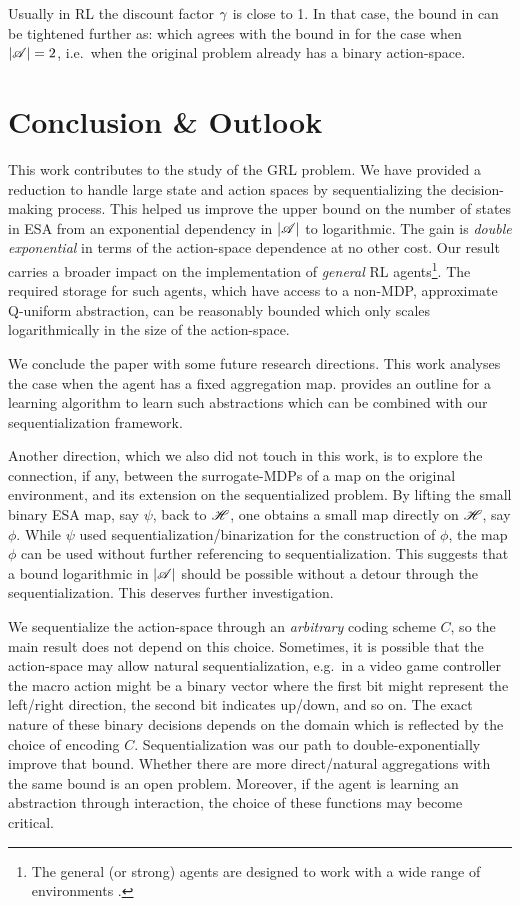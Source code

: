 \documentclass{article} %
\begin{document}
Usually in RL the discount factor $\gamma$ is close to 1. In that case, the bound in  can be tightened further as:
\beq
\abs{\S} \lesssim {}
\eeq
which agrees with the bound in  for the case when ${\left\lvert\mathscr{A}\right\rvert} = 2$, i.e.\ when the original problem already has a binary action-space.

\section{Conclusion \& Outlook}\label{sec:conclusion}
\vspace{-1.87mm}

This work contributes to the study of the GRL problem. We have provided a reduction to handle large state and action spaces by sequentializing the decision-making process.
This helped us improve the upper bound on the number of states in ESA from an exponential dependency in ${\left\lvert\mathscr{A}\right\rvert}$ to logarithmic. The gain is \emph{double exponential} in terms of the action-space dependence at no other cost.  
Our result carries a broader impact on the implementation of \emph{general} RL agents\footnote{The general (or strong) agents are designed to work with a wide range of environments \cite{Hutter2000}.}. The required storage for such agents, which have access to a non-MDP, approximate Q-uniform abstraction, can be reasonably bounded which only scales logarithmically in the size of the action-space.

We conclude the paper with some future research directions. This work analyses the case when the agent has a fixed aggregation map. \citet{Hutter2016} provides an outline for a learning algorithm to learn such abstractions which can be combined with our sequentialization framework.

Another direction, which we also did not touch in this work, is to explore the connection, if any, between the surrogate-MDPs of a map on the original environment, and its extension on the sequentialized problem. By lifting the small binary ESA map, say $\psi$, back to $\mathscr{H}$, one obtains a small map directly on $\mathscr{H}$, say $\phi$. While $\psi$ used sequentialization/binarization for the construction of $\phi$, the map $\phi$ can be used without further referencing to sequentialization. This suggests that a bound logarithmic in ${\left\lvert\mathscr{A}\right\rvert}$ should be possible without a detour through the sequentialization. This deserves further investigation.

We sequentialize the action-space through an \emph{arbitrary} coding scheme $C$, so the main result does not depend on this choice. Sometimes, it is possible that the action-space may allow natural sequentialization, e.g.\ in a video game controller the macro action might be a binary vector where the first bit might represent the left/right direction, the second bit indicates up/down, and so on. The exact nature of these binary decisions depends on the domain which is reflected by the choice of encoding $C$. Sequentialization was our path to double-exponentially improve that bound. Whether there are more direct/natural aggregations with the same bound is an open problem. Moreover, if the agent is learning an abstraction through interaction, the choice of these functions may become critical.
\end{document}
